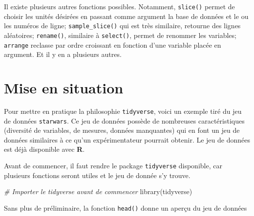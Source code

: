 \documentclass[
]{book}
\newenvironment{Shaded}{}{}
\newcommand{\CommentTok}[1]{\textit{#1}}
\newcommand{\FunctionTok}[1]{#1}
\newcommand{\NormalTok}[1]{#1}
\begin{document}
Il existe plusieurs autres fonctions possibles. Notamment, \texttt{slice()} permet de choisir les unités désirées en passant comme argument la base de données et le ou les numéros de ligne; \texttt{sample\_slice()} qui est très similaire, retourne des lignes aléatoires; \texttt{rename()}, similaire à \texttt{select()}, permet de renommer les variables; \texttt{arrange} reclasse par ordre croissant en fonction d'une variable placée en argument. Et il y en a plusieurs autres.

\hypertarget{mise-en-situation}{%
\section{Mise en situation}\label{mise-en-situation}}

Pour mettre en pratique la philosophie \texttt{tidyverse}, voici un exemple tiré du jeu de données \texttt{starwars}. Ce jeu de données possède de nombreuses caractéristiques (diversité de variables, de mesures, données manquantes) qui en font un jeu de données similaires à ce qu'un expérimentateur pourrait obtenir. Le jeu de données est déjà disponible avec \textbf{R}.

Avant de commencer, il faut rendre le package \texttt{tidyverse} disponible, car plusieurs fonctions seront utiles et le jeu de donnée s'y trouve.

\begin{Shaded}
\begin{Highlighting}[]
\CommentTok{\# Importer le tidyverse avant de commencer}
\FunctionTok{library}\NormalTok{(tidyverse)}
\end{Highlighting}
\end{Shaded}

Sans plus de préliminaire, la fonction \texttt{head()} donne un aperçu du jeu de données
\end{document}
